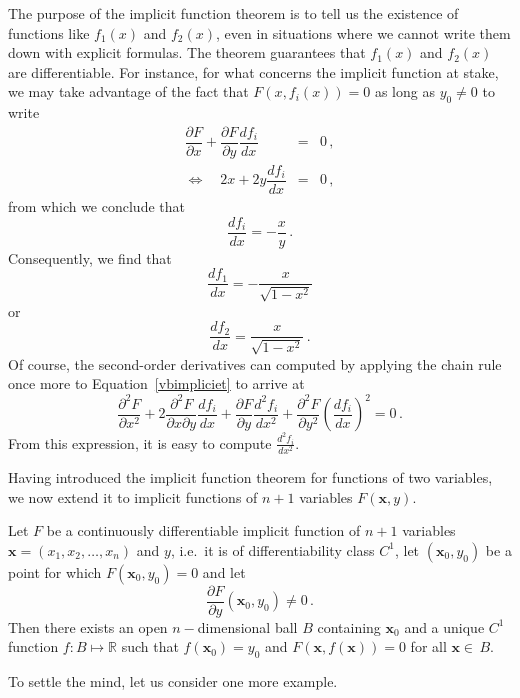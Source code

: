 \begin{example}
The purpose of the implicit function theorem is to tell us the existence of functions like $f_1(x)$ and $f_2(x)$, even in situations where we cannot write them down with explicit formulas. The theorem guarantees that $f_1(x)$ and $f_2(x)$ are differentiable. For instance, for what concerns the implicit function at stake, we may take advantage of the fact that $F(x,f_i(x))=0$ as long as $y_0\neq0$ to write
\begin{eqnarray}
\dfrac{\partial F}{\partial x}+\dfrac{\partial F}{\partial y}\dfrac{df_i}{dx}&=&0\,,\label{vbimpliciet}\\[0.2cm]
\Leftrightarrow\quad2x+2y\dfrac{df_i}{dx}&=&0\,,\nonumber
\end{eqnarray}
from which we conclude that
$$
\dfrac{df_i}{dx}=-\dfrac{x}{y}\,.
$$
Consequently, we find that
$$
\dfrac{df_1}{dx}=-\dfrac{x}{\sqrt{1-x^2}}
$$
or
$$
\dfrac{df_2}{dx}=\dfrac{x}{\sqrt{1-x^2}}\,.
$$
Of course, the second-order derivatives can computed by applying the chain rule once more to Equation~\eqref{vbimpliciet} to arrive at
$$
\dfrac{\partial^2 F}{\partial x^2}+2\dfrac{\partial^2 F}{\partial x\partial y}\dfrac{df_i}{dx}+\dfrac{\partial F}{\partial y}\dfrac{d^2f_i}{dx^2}+\dfrac{\partial^2 F}{\partial y^2}\left(\dfrac{df_i}{dx}\right)^2=0\,.
$$
From this expression, it is easy to compute $\frac{d^2f_i}{dx^2}$.
\end{example}

Having introduced the implicit function theorem for functions of two variables, we now extend it to implicit functions of $n+1$ variables $F(\mathbf{x},y)$.

\begin{theorem}
\label{thm:implicit2}
Let $F$ be a continuously differentiable implicit function of $n+1$ variables $\mathbf{x}=(x_1,x_2,\ldots,x_n)$ and $y$, i.e.\ it is of differentiability  class $C^1$,  let $(\mathbf{x}_0,y_0)$ be a point for which $F(\mathbf{x}_0,y_0)=0$ and let 
$$
\dfrac{\partial F}{\partial y}(\mathbf{x}_0,y_0)\neq0\,.
$$
Then there exists an open $n-$dimensional ball $B$ containing $\mathbf{x}_0$ and a unique $C^1$ function $f:B\mapsto\mathbb{R}$ such that
$f(\mathbf{x}_0)=y_0$ and $F(\mathbf{x},f(\mathbf{x}))=0$ for all $\mathbf{x}\in\,B$.
\end{theorem}

To settle the mind, let us consider one more example. 

